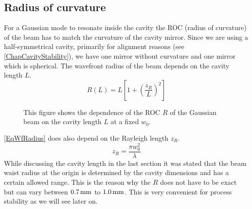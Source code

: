 \subsection{Radius of curvature}
For a Gaussian mode to resonate inside the cavity the ROC (radius of curvature) of the beam has to match the curvature of the cavity mirror. Since we are using a half-symmetrical cavity, primarily for alignment reasons (see \autoref{ChapCavityStability}), we have one mirror without curvature and one mirror which is spherical. The wavefront radius of the beam depends on the cavity length $L$.
\begin{equation}\label{EqWfRadius}
	R(L)=L\left[1+\left(\frac{z_{\si{R}}}{L}\right)^2\right]
\end{equation}
\begin{figure}[H]
	
	\caption{This figure shows the dependence of the ROC $R$ of the Gaussian beam on the cavity length $L$ at a fixed $w_0$.}
\end{figure}
\autoref{EqWfRadius} does also depend on the Rayleigh length $z_{\si{R}}$.
\begin{equation}\label{EqRayleighRange}
	z_{\si{R}}=\frac{\pi w_0^2}{\lambda}
\end{equation}
While discussing the cavity length in the last section it was stated that the beam waist radius at the origin is determined by the cavity dimensions and has a certain allowed range. This is the reason why the $R$ does not have to be exact but can vary between $0.7\,\text{mm}$ to $1.0\,\text{mm}$. This is very convenient for process stability as we will see later on.

